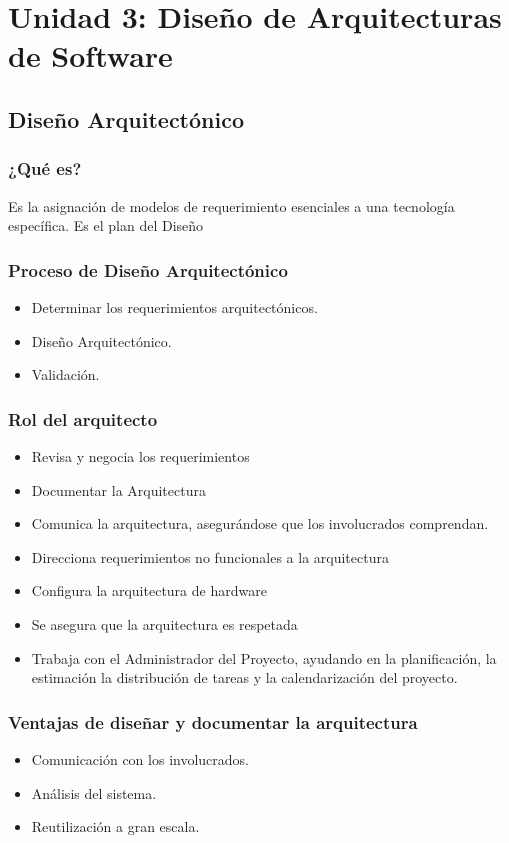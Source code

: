 \section{Unidad 3: Diseño de Arquitecturas de Software}
\subsection{Diseño Arquitectónico}
\subsubsection{¿Qué es?}
Es la asignación de modelos de requerimiento esenciales a una tecnología específica. Es el plan del Diseño
\subsubsection{Proceso de Diseño Arquitectónico}
\begin{itemize}
	\item Determinar los requerimientos arquitectónicos.
	\item Diseño Arquitectónico.
	\item Validación.
\end{itemize}
\subsubsection{Rol del arquitecto}
\begin{itemize}
\item Revisa y negocia los requerimientos
\item Documentar la Arquitectura
\item Comunica la arquitectura, asegurándose que los involucrados comprendan.
\item Direcciona requerimientos no funcionales a la arquitectura
\item Configura la arquitectura de hardware
\item Se asegura que la arquitectura es respetada
\item Trabaja con el Administrador del Proyecto, ayudando en la planificación, la estimación la distribución de tareas y la calendarización del proyecto.
\end{itemize}
\subsubsection{Ventajas de diseñar y documentar la arquitectura}
\begin{itemize}
	\item Comunicación con los involucrados.
	\item Análisis del sistema.
	\item Reutilización a gran escala.
\end{itemize}
